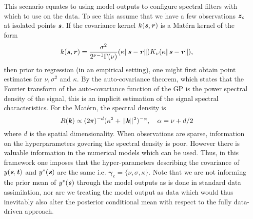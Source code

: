 \documentclass[10pt,a4paper]{article}
\newcommand{\gammab} {\boldsymbol{\gamma}}
\newcommand{\kvec} {\textbf{\textit{k}}}
\newcommand{\tvec} {\textbf{\textit{t}}}
\newcommand{\zvec} {\textbf{\textit{z}}}
\newcommand{\svec} {\textbf{\textit{s}}}
\newcommand{\rvec} {\textbf{\textit{r}}}
\begin{document}
This scenario equates to using model outputs to configure spectral filters with which to use on the data. To see this assume that we have a few observations $\zvec_o$ at isolated points $\svec$. If the covariance kernel $k(\svec,\rvec)$ is a Mat{\'e}rn kernel of the form
\begin{equation}\label{eq:Matern}
k(\svec,\rvec) = \frac{\sigma^2}{2^{\nu-1}\Gamma(\nu)}(\kappa\| \svec - \rvec \|)K_\nu(\kappa\| \svec - \rvec \|),
\end{equation}
\noindent then prior to regression (in an empirical setting), one might first obtain point estimates for $\nu, \sigma^2$ and $\kappa$. By the auto-covariance theorem, which states that the Fourier transform of the auto-covariance function of the GP is the power spectral density of the signal, this is an implicit estimation of the signal spectral characteristics. For the Mat{\'e}rn, the spectral density is 
\begin{equation}
R(\kvec) \propto (2\pi)^{-d}(\kappa^2 + ||\kvec||^2)^{-\alpha}, ~~~ \alpha = \nu + d/2
\end{equation}
\noindent where $d$ is the spatial dimensionality. When observations are sparse, information on the hyperparameters govering the spectral density is poor. However there is valuable information in the numerical models which can be used. Thus, in this framework one imposes  that the hyper-parameters describing the covariance of $y(\svec,\tvec)$ and $y^*(\svec)$ are the same i.e. $\gammab_c = \{\nu, \sigma, \kappa\}$. Note that we are not informing the prior mean of $y^*(\svec)$ through the model outputs as is done in standard data assimilation, nor are we treating the model output as data which would thus inevitably also alter the posterior conditional mean with respect to the fully data-driven approach.
\end{document}
